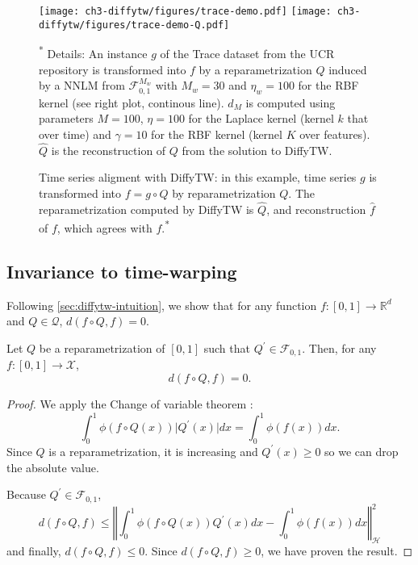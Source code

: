 \begin{figure}[ht!]
\begin{center}
\texttt{[image: ch3-diffytw/figures/trace-demo.pdf]}
\texttt{[image: ch3-diffytw/figures/trace-demo-Q.pdf]}
\end{center}
\caption[Time series alignment with DiffyTW]{Time series aligment with DiffyTW: in this example, time series $g$ is transformed into $f=g\circ Q$ by reparametrization $Q$. The reparametrization computed by DiffyTW is $\hat Q$, and reconstruction $\hat f$ of $f$, which agrees with $f$.\textsuperscript{*}}
\small\textsuperscript{*} Details: An instance $g$ of the Trace dataset from the UCR repository is transformed into $f$ by a reparametrization $Q$ induced by a NNLM from $\mathcal F_{0,1}^{M_w}$ with $M_{w}=30$ and $\eta_w= 100$ for the RBF kernel (see right plot, continous line). $\hat d_M$ is computed using parameters $M=100$, $\eta =100$ for the Laplace kernel (kernel $k$ that over time) and $\gamma=10$ for the RBF kernel (kernel $K$ over features). $\hat Q$ is the reconstruction of $Q$ from the solution to DiffyTW.
\end{figure}

\subsection{Invariance to time-warping}
Following \cref{sec:diffytw-intuition}, we show that for any function $f: [0,1] \to \mathbb R^d$ and $Q\in\mathcal Q$, $d(f\circ Q, f)=0$.
\begin{theorem}\label{thm:diffytw-invariance}
Let $Q$ be a reparametrization of $[0,1]$ such that $Q^\prime \in \mathcal F_{0, 1}$. Then, for any $f: [0,1] \to \mathcal X$,
\begin{equation}
    d(f\circ Q, f) = 0.
\end{equation}
\end{theorem}

\begin{proof}
We apply the Change of variable theorem \citep{aliprantis1998principles}:
\begin{equation}
\int_0^1 \phi(f\circ Q(x))\vert Q^\prime(x)\vert dx = \int_0^1 \phi(f(x))dx.
\end{equation}
Since $Q$ is a reparametrization, it is increasing and $Q^\prime(x) \geq 0$ so we can drop the absolute value.

Because $Q^\prime \in \mathcal F_{0,1}$,
\begin{equation}
    d(f\circ Q, f) \leq \left \Vert \int_0^1 \phi(f\circ Q(x))Q^\prime(x)dx - \int_0^1 \phi(f(x))dx\right\Vert_\mathcal H^2
\end{equation}
and finally, $d(f\circ Q, f) \leq 0$. Since $d(f\circ Q, f) \geq 0$, we have proven the result.
\end{proof}

